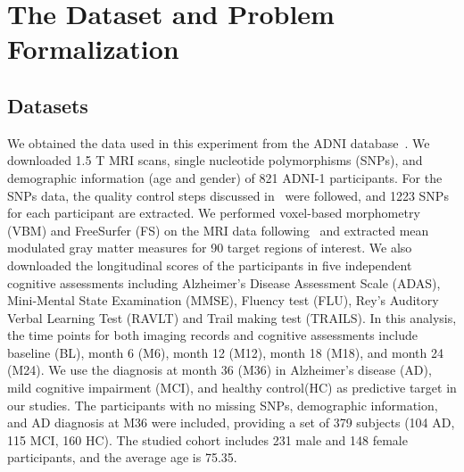 \section{The Dataset and Problem Formalization}
\subsection{Datasets}
We obtained the data used in this experiment from the ADNI database~\cite{risacher2010longitudinal}. We downloaded 1.5 T MRI scans, single nucleotide polymorphisms (SNPs), and demographic information (age and gender) of 821 ADNI-1 participants. For the SNPs data, the quality control steps discussed in~\cite{shen2010whole} were followed, and 1223 SNPs for each participant are extracted. We performed voxel-based morphometry (VBM) and FreeSurfer (FS) on the MRI data following~\cite{risacher2010longitudinal} and extracted mean modulated gray matter measures for 90 target regions of interest. We also downloaded the longitudinal scores of the participants in five independent cognitive assessments including Alzheimer’s Disease Assessment Scale (ADAS), Mini-Mental State Examination (MMSE), Fluency test (FLU), Rey’s Auditory Verbal Learning Test (RAVLT) and Trail making test (TRAILS). 
In this analysis, the time points for both imaging records and cognitive assessments include baseline (BL), month 6 (M6), month 12 (M12), month 18 (M18), and month 24 (M24). We use the diagnosis at month 36 (M36) in Alzheimer's disease (AD), mild cognitive impairment (MCI), and healthy control(HC) as predictive target in our studies. The participants with no missing SNPs, demographic information, and AD diagnosis at M36 were included, providing a set of 379 subjects (104 AD, 115 MCI, 160 HC). The studied cohort includes 231 male and 148 female participants, and the average age is 75.35.

